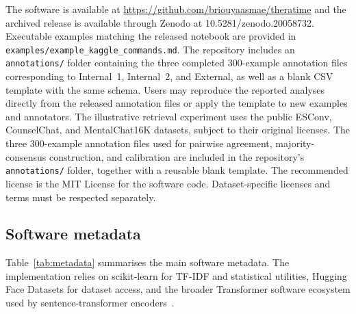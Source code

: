 \documentclass[preprint,12pt,a4paper]{elsarticle}
\newcommand{\theratimeRepository}{\url{https://github.com/briouyaasmae/theratime}}
\newcommand{\theratimeZenodo}{10.5281/zenodo.20058732}
\begin{document}
The software is available at \theratimeRepository{} and the archived release is available through Zenodo at \theratimeZenodo{}. Executable examples matching the released notebook are provided in \texttt{examples/example\_kaggle\_commands.md}. The repository includes an \texttt{annotations/} folder containing the three completed 300-example annotation files corresponding to Internal~1, Internal~2, and External, as well as a blank CSV template with the same schema. Users may reproduce the reported analyses directly from the released annotation files or apply the template to new examples and annotators. The illustrative retrieval experiment uses the public ESConv, CounselChat, and MentalChat16K datasets, subject to their original licenses. The three 300-example annotation files used for pairwise agreement, majority-consensus construction, and calibration are included in the repository's \texttt{annotations/} folder, together with a reusable blank template. The recommended license is the MIT License for the software code. Dataset-specific licenses and terms must be respected separately.

\subsection{Software metadata}

Table~\ref{tab:metadata} summarises the main software metadata. The implementation relies on scikit-learn for TF-IDF and statistical utilities, Hugging Face Datasets for dataset access, and the broader Transformer software ecosystem used by sentence-transformer encoders~\cite{Pedregosa2011ScikitLearn,McInnes2021HuggingFaceDatasets,Wolf2020Transformers}.
\end{document}
